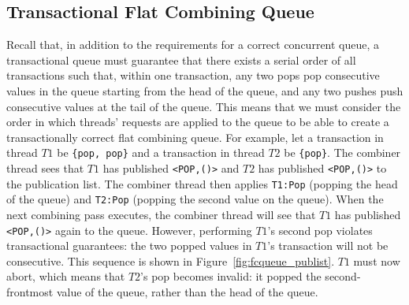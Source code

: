 \subsection{Transactional Flat Combining Queue} 
\label{fcqueuet}

Recall that, in addition to the requirements for a correct concurrent queue, a transactional queue must guarantee that there exists a serial order of all transactions such that, within one transaction, any two pops pop consecutive values in the queue starting from the head of the queue, and any two pushes push consecutive values at the tail of the queue.
This means that we must consider the order in which threads' requests are applied to the queue to be able to create a transactionally correct flat combining queue. For example, let a transaction in thread $T1$ be \texttt{\{pop, pop\}} and a transaction in thread $T2$ be \texttt{\{pop\}}. The combiner thread sees that $T1$ has published \texttt{<POP,()>} and $T2$ has published \texttt{<POP,()>} to the publication list. The combiner thread then applies \texttt{T1:Pop} (popping the head of the queue) and \texttt{T2:Pop} (popping the second value on the queue). When the next combining pass executes, the combiner thread will see that $T1$ has published \texttt{<POP,()>} again to the queue. However, performing $T1$'s second pop violates transactional guarantees: the two popped values in $T1$'s transaction will not be consecutive. This sequence is shown in Figure~\ref{fig:fcqueue_publist}. $T1$ must now abort, which means that $T2$'s pop becomes invalid: it popped the second-frontmost value of the queue, rather than the head of the queue.

